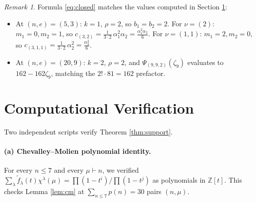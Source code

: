 \documentclass[11pt]{article}
\theoremstyle{remark}
\newtheorem{remark}[theorem]{Remark}
\newcommand{\ftilde}{\widetilde{f}}
\newcommand{\ZZ}{\mathbb{Z}}
\begin{document}
\begin{remark}
Formula \eqref{eq:closed} matches the values computed in Section \ref{sec:verif}:
\begin{itemize}
\item At $(n, e) = (5, 3)$: $k = 1$, $\rho = 2$, so $b_1 = b_2 = 2$. For $\nu = (2)$: $m_1 = 0, m_2 = 1$, so $c_{(3,2)} = \tfrac{1}{3 \cdot 2}\, \alpha_1^2 \alpha_2 = \tfrac{\alpha_1^2 \alpha_2}{6}$. For $\nu = (1,1)$: $m_1 = 2, m_2 = 0$, so $c_{(3,1,1)} = \tfrac{1}{3 \cdot 2}\, \alpha_2^2 = \tfrac{\alpha_2^2}{6}$.
\item At $(n, e) = (20, 9)$: $k = 2$, $\rho = 2$, and $\Psi_{(9,9,2)}(\zeta_9)$ evaluates to $162 - 162\zeta_9$, matching the $2! \cdot 81 = 162$ prefactor.
\end{itemize}
\end{remark}

\section{Computational Verification}\label{sec:verif}

Two independent scripts verify Theorem \ref{thm:support}.

\paragraph{(a) Chevalley--Molien polynomial identity.} For every $n \le 7$ and every $\mu \vdash n$, we verified $\sum_\lambda \ftilde_\lambda(t) \chi^\lambda(\mu) = \prod(1-t^i)/\prod(1-t^j)$ as polynomials in $\ZZ[t]$. This checks Lemma \ref{lem:cm} at $\sum_{n \le 7} p(n) = 30$ pairs $(n, \mu)$.
\end{document}
